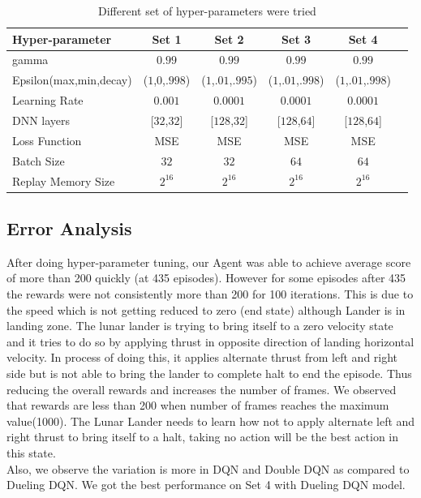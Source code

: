 \label{sec:exp1}
\begin{table}%
\begin{tabular}{|l|c|c|c|c|c|}
\hline
Hyper-parameter & Set 1  & Set 2 & Set 3 & Set 4  \\
\hline
gamma & $0.99$ & $0.99$ & $0.99$ & $0.99$ \\
\hline
Epsilon(max,min,decay) & ($1$,$0$,$.998$) &  ($1$,$.01$,$.995$) &  ($1$,$.01$,$.998$) &  ($1$,$.01$,$.998$) \\
\hline
Learning Rate & $0.001$ & $0.0001$ & $0.0001$ & $0.0001$ \\
\hline
DNN layers & [$32$,$32$] &  [$128$,$32$] &  [$128$,$64$] &  [$128$,$64$] \\
\hline
Loss Function & MSE & MSE & MSE & MSE \\
\hline
Batch Size & $32$ & $32$  & $64$  & $64$  \\
\hline
Replay Memory Size & $2^16$ & $2^16$  & $2^16$  & $2^16$  \\
\hline
\end{tabular}
\caption{Different set of hyper-parameters were tried}
\label{tab:Hyper Parameter Set table}
\end{table}
\subsection{ Error Analysis}
 After doing hyper-parameter tuning, our Agent was able to achieve average score of more than 200 quickly (at 435 episodes). 
However for some episodes after 435 the rewards were not consistently more than 200 for 100 iterations. This is due to the speed 
which is not getting reduced to zero (end state) although Lander is in landing zone.  The lunar lander is trying to bring itself to a zero velocity state and it tries to do so by applying thrust in opposite direction of landing horizontal velocity. In process of doing this, it applies alternate thrust from left and right side but is not able to bring the lander to complete halt to end the episode. Thus reducing the overall rewards and increases the number of frames. We observed that rewards are less than 200 when number of frames reaches the maximum value(1000). The Lunar Lander needs to learn how not to apply alternate left and right thrust to bring itself to a halt, taking no action will be the best action in this state. \\

Also, we observe the variation is more in DQN and Double DQN as compared to Dueling DQN. We got the best performance on Set 4 with Dueling DQN model.

